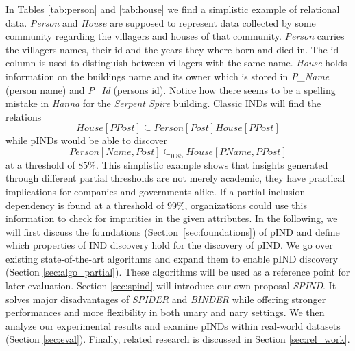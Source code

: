 In Tables \ref{tab:person} and \ref{tab:house} we find a simplistic example of relational data. \textit{Person} and \textit{House} are supposed to represent data collected by some community regarding the villagers and houses of that community. \textit{Person} carries the villagers names, their id and the years they where born and died in. The id column is used to distinguish between villagers with the same name. \textit{House} holds information on the buildings name and its owner which is stored in \textit{P\_Name} (person name) and \textit{P\_Id} (persons id). Notice how there seems to be a spelling mistake in \textit{Hanna} for the \textit{Serpent Spire} building. Classic INDs will find the relations $$\textit{House}[\textit{PPost}]\subseteq \textit{Person}[\textit{Post}] \textit{House}[\textit{PPost}]$$ while pINDs would be able to discover $$\textit{Person}[\textit{Name}, \textit{Post}] \subseteq_{0.85} \textit{House}[\textit{PName}, \textit{PPost}]$$ at a threshold of $85\%$. This simplistic example shows that insights generated through different partial thresholds are not merely academic, they have practical implications for companies and governments alike. If a partial inclusion dependency is found at a threshold of $99\%$, organizations could use this information to check for impurities in the given attributes. In the following, we will first discuss the foundations (Section~\ref{sec:foundations}) of pIND and define which properties of IND discovery hold for the discovery of pIND. We go over existing state-of-the-art algorithms and expand them to enable pIND discovery (Section \ref{sec:algo_partial}). These algorithms will be used as a reference point for later evaluation. Section \ref{sec:spind} will introduce our own proposal \textit{SPIND}. It solves major disadvantages of \textit{SPIDER} \cite{bauckmann2006efficiently} and \textit{BINDER} \cite{papenbrock2015divide} while offering stronger performances and more flexibility in both unary and nary settings. We then analyze our experimental results and examine pINDs within real-world datasets (Section \ref{sec:eval}). Finally, related research is discussed in Section \ref{sec:rel_work}.